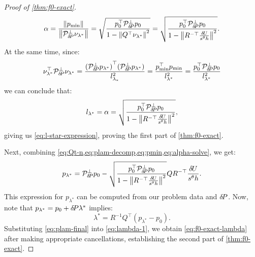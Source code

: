 \documentclass{article}
\begin{document}
\begin{proof}[Proof of \cref{thm:f0-exact}]
\begin{equation}
    \alpha = \frac{\left\|p_{\operatorname{min}}\right\|}{\left\|\mathcal{P}^\perp_{{\delta \hspace{-0.14em} P}} \nu_{\lambda^*}\right\|} = \sqrt{\frac{p_0^\top \mathcal{P}^\perp_{{\delta \hspace{-0.14em} P}} p_0}{1 - \left\|Q^\top \nu_{\lambda^*}\right\|^2}} = \sqrt{\frac{p_0^\top \mathcal{P}^\perp_{{\delta \hspace{-0.14em} P}} p_0}{1 - \left\|R^{-\top} \frac{{\delta \hspace{-0.09em} U}}{s^\theta h}\right\|^2}}.
  \end{equation}
  At the same time, since:
  \begin{equation}
    \nu_{\lambda^*}^\top \mathcal{P}^\perp_{{\delta \hspace{-0.14em} P}} \nu_{\lambda^*} = \frac{{(\mathcal{P}^\perp_{{\delta \hspace{-0.14em} P}} p_{\lambda^*})}^\top {(\mathcal{P}^\perp_{{\delta \hspace{-0.14em} P}} p_{\lambda^*})}}{l_{\lambda_*}^2} = \frac{p_{\operatorname{min}}^\top p_{\operatorname{min}}}{l_{\lambda^*}^2} = \frac{p_0^\top \mathcal{P}^\perp_{{\delta \hspace{-0.14em} P}} p_0}{l_{\lambda^*}^2}
  \end{equation}
  we can conclude that:
  \begin{equation}
    l_{\lambda^*} = \alpha = \sqrt{\frac{p_0^\top \mathcal{P}^\perp_{{\delta \hspace{-0.14em} P}} p_0}{1 - \left\|R^{-\top} \frac{{\delta \hspace{-0.09em} U}}{s^\theta h}\right\|^2}},
  \end{equation}
  giving us \cref{eq:l-star-expression}, proving the first part of
  \cref{thm:f0-exact}.

  Next, combining
  \cref{eq:Qt-n,eq:plam-decomp,eq:pmin,eq:alpha-solve}, we get:
  \begin{equation}\label{eq:plam-final}
    p_{\lambda^*} = \mathcal{P}^\perp_{{\delta \hspace{-0.14em} P}} p_0 - \sqrt{\frac{p_0^\top \mathcal{P}^\perp_{{\delta \hspace{-0.14em} P}} p_0}{1 - \left\|R^{-\top} \frac{{\delta \hspace{-0.09em} U}}{s^\theta h}\right\|^2}} Q R^{-\top} \frac{{\delta \hspace{-0.09em} U}}{s^\theta h}.
  \end{equation}
  This expression for $p_{\lambda^*}$ can be computed from our problem
  data and ${\delta \hspace{-0.14em} P}$. Now, note that
  $p_{\lambda^*} = p_0 + {\delta \hspace{-0.14em} P} \lambda^*$ implies:
  \begin{equation}\label{eq:lambda-1}
    \lambda^* = R^{-1} Q^\top (p_{\lambda^*} - p_0).
  \end{equation}
  Substituting \cref{eq:plam-final} into \cref{eq:lambda-1}, we obtain
  \cref{eq:f0-exact-lambda} after making appropriate cancellations,
  establishing the second part of \cref{thm:f0-exact}.


\end{proof}
\end{document}
